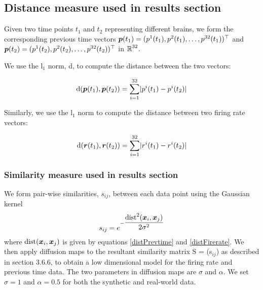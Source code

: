 \subsection{Distance measure used in results section}
Given two time points $t_{1}$ and $t_{2}$ representing different brains, we form 
the corresponding previous time vectors $\boldsymbol{p}(t_{1})= (p^{1}(t_{1}), p^{2}(t_{1}), \ldots, p^{32}(t_{1}))^{\top} $  and  $\boldsymbol{p}(t_{2}) = (p^{1}(t_{2}), p^{2}(t_{2}), \ldots, p^{32}(t_{2}))^{\top}$ in $\operatorname{\mathbb{R}}^{32}$.

We use the l$_{1}$ norm, d, to compute the distance between the two vectors:

\begin{equation}\label{distPrevtime}
\text{d}(\boldsymbol{p}(t_{1}), \boldsymbol{p}(t_{2}) ) = 
\displaystyle \sum_{i=1}^{32} \lvert p^{i}(t_{1}) - p^{i}(t_{2})   \rvert
\end{equation}

Similarly, we use the l$_{1}$ norm to compute the distance between two firing rate vectors:

\begin{equation}\label{distFirerate}
\text{d}(\boldsymbol{r}(t_{1}), \boldsymbol{r}(t_{2}) ) = 
\displaystyle \sum_{i=1}^{32} \lvert r^{i}(t_{1}) - r^{i}(t_{2})   \rvert
\end{equation}


\subsubsection{Similarity measure used in results section}
We form pair-wise similarities, $s_{ij}$, between each data point
using the Gaussian kernel 
\[
s_{ij} = e^{-\dfrac{\text{dist}^{2}(\boldsymbol{x}_{i}, \boldsymbol{x}_{j})}{2\sigma^2}} 
\]
where $\text{dist}(\boldsymbol{x}_{i}, \boldsymbol{x}_{j})$ is given by equations
\eqref{distPrevtime} and \eqref{distFirerate}.
We then apply diffusion maps to the resultant similarity matrix S = (s$_{ij}$) 
as described in section 3.6.6, to obtain a low dimensional model for the 
firing rate and previous time data.
The two parameters in diffusion maps are $\sigma$ and $\alpha$.
We set $\sigma =1$ and $\alpha = 0.5$ for both the synthetic and real-world data.























